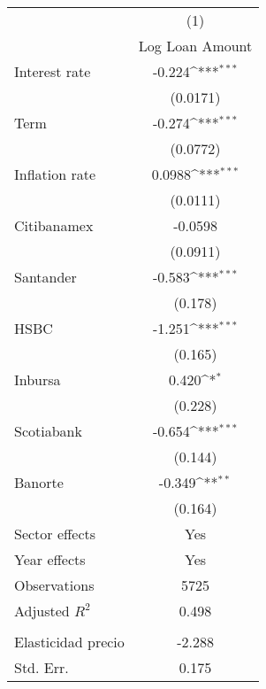 {
\def\sym#1{\ifmmode^{#1}\else\(^{#1}\)\fi}
\begin{tabular}{l*{1}{c}}
\hline\hline
                &\multicolumn{1}{c}{(1)}\\
                &\multicolumn{1}{c}{Log Loan Amount}\\
\hline
Interest rate   &   -0.224\sym{***}\\
                & (0.0171)         \\
Term            &   -0.274\sym{***}\\
                & (0.0772)         \\
Inflation rate  &   0.0988\sym{***}\\
                & (0.0111)         \\
Citibanamex     &  -0.0598         \\
                & (0.0911)         \\
Santander       &   -0.583\sym{***}\\
                &  (0.178)         \\
HSBC            &   -1.251\sym{***}\\
                &  (0.165)         \\
Inbursa         &    0.420\sym{*}  \\
                &  (0.228)         \\
Scotiabank      &   -0.654\sym{***}\\
                &  (0.144)         \\
Banorte         &   -0.349\sym{**} \\
                &  (0.164)         \\
Sector effects  &      Yes         \\
Year effects    &      Yes         \\
\hline
Observations    &     5725         \\
Adjusted \(R^{2}\)&    0.498         \\
\hline          &                  \\
\hspace{5mm} Elasticidad precio&   -2.288         \\
\hspace{5mm} Std. Err.&    0.175         \\
\hline\hline
\end{tabular}
}
